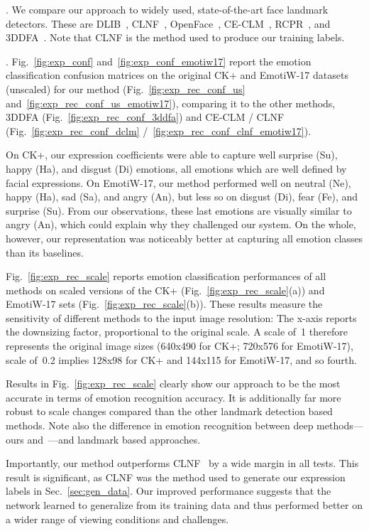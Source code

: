 \documentclass[a4paper, 10pt, conference]{ieeeconf}
\newcommand{\minisection}[1]{\vspace{2mm}\noindent{\bf #1}.}
\begin{document}
{\minisection{Baseline methods} We compare our approach to widely used, state-of-the-art face landmark detectors. These are DLIB~\cite{king2009dlib}, CLNF~\cite{baltrusaitis2013constrained}, OpenFace~\cite{baltruvsaitis2016openface}, CE-CLM~\cite{zadeh2016deep}, RCPR~\cite{burgos2013robust}, and 3DDFA~\cite{zhu2015}. Note that CLNF is the method used to produce our training labels. 
 
\minisection{Results} Fig.~\ref{fig:exp_conf} and~\ref{fig:exp_conf_emotiw17} report the emotion classification confusion matrices on the original CK+ and EmotiW-17 datasets (unscaled) for our method (Fig.~\ref{fig:exp_rec_conf_us} and~\ref{fig:exp_rec_conf_us_emotiw17}), comparing it to the other methods, 3DDFA (Fig.~\ref{fig:exp_rec_conf_3ddfa}) and CE-CLM / CLNF (Fig.~\ref{fig:exp_rec_conf_dclm} /~\ref{fig:exp_rec_conf_clnf_emotiw17}). 

On CK+, our expression coefficients were able to capture well surprise (Su), happy (Ha), and disgust (Di) emotions, all emotions which are well defined by facial expressions. On EmotiW-17, our method performed well on neutral (Ne), happy (Ha), sad (Sa), and angry (An), but less so on disgust (Di), fear (Fe), and surprise (Su). From our observations, these last emotions are visually similar to angry (An), which could explain why they challenged our system. On the whole, however, our representation was noticeably better at capturing all emotion classes than its baselines. 


Fig.~\ref{fig:exp_rec_scale} reports emotion classification performances of all methods on scaled versions of the CK+ (Fig.~\ref{fig:exp_rec_scale}(a)) and EmotiW-17 sets (Fig.~\ref{fig:exp_rec_scale}(b)). These results measure the sensitivity of different methods to the input image resolution: The x-axis reports the downsizing factor, proportional to the original scale. A scale of~1 therefore represents the original image sizes (640x490 for CK+; 720x576 for EmotiW-17), scale of~0.2 implies 128x98 for CK+ and 144x115 for EmotiW-17, and so fourth. 

Results in Fig.~\ref{fig:exp_rec_scale} clearly show our approach to be the most accurate in terms of emotion recognition accuracy. It is additionally far more robust to scale changes compared than the other landmark detection based methods. Note also the  difference in emotion recognition between deep methods---ours and~\cite{zhu2015}---and landmark based approaches.

Importantly, our method outperforms CLNF~\cite{baltrusaitis2013constrained} by a wide margin in all tests. This result is significant, as CLNF was the method used to generate our expression labels in Sec.~\ref{sec:gen_data}. Our improved performance suggests that the network learned to generalize from its training data and thus performed better on a wider range of viewing conditions and challenges.



}
\end{document}
